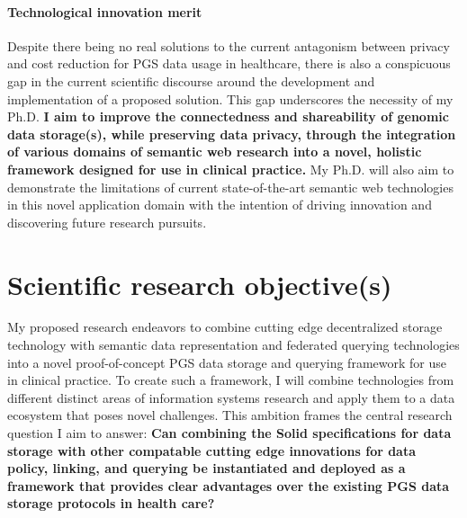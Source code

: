 \documentclass[a4paper,11pt]{article}
\begin{document}
\begin{refsection}
\paragraph{Technological innovation merit}


Despite there being no real solutions to the current antagonism between privacy and cost reduction for PGS data usage in healthcare, there is also a conspicuous gap in the current scientific discourse around the development and implementation of a proposed solution. 
This gap underscores the necessity of my Ph.D.
\textbf{I aim to improve the connectedness and shareability of genomic data storage(s), while preserving data privacy, through the 
integration of various domains of semantic web research into a novel, holistic framework designed for use in clinical practice.}
My Ph.D. will also aim to demonstrate the limitations of current state-of-the-art semantic web technologies in this novel application domain with the intention of driving innovation and discovering future research pursuits.



\section{Scientific research objective(s)}

\begin{comment}
Describe explicitly the scientific objective(s) and the research hypothesis. 
Explain whether and how the research is specifically challenging and inventive, describing in particular the innovative aspects of the envisaged results. 
Discuss in detail the results (or partial results) that you aim to achieve, such as specific knowledge, the solution to particular problems and academic breakthroughs.
\end{comment}
\smallskip

\noindent
My proposed research endeavors to combine cutting edge decentralized storage technology with semantic data representation and federated querying technologies into a novel proof-of-concept PGS data storage and querying framework for use in clinical practice. 
To create such a framework, I will combine technologies from different distinct areas of information systems research and apply them to a data ecosystem that poses novel challenges.
This ambition frames the central research question I aim to answer: \textbf{Can combining the Solid specifications for data storage with other compatable cutting edge innovations for data policy, linking, and querying be instantiated and deployed as a framework that provides clear advantages over the existing PGS data storage protocols in health care?}


\end{refsection}
\end{document}
